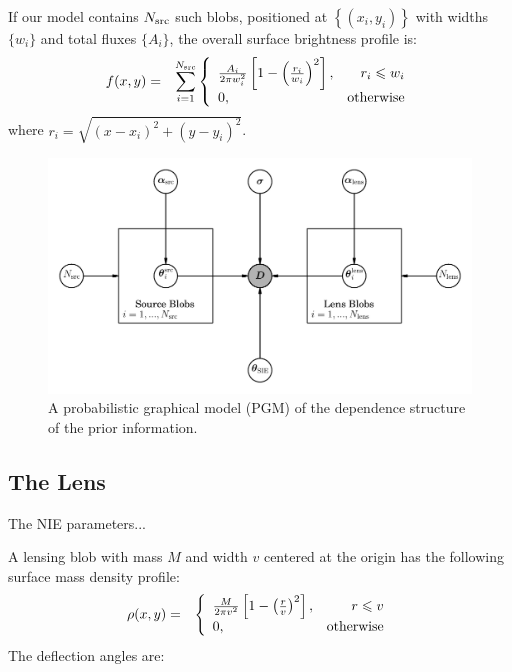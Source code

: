 \documentclass[useAMS,usenatbib]{mn2e}
\begin{document}
If our model contains $N_{\rm src}$ such blobs, positioned at
$\left\{(x_i, y_i)\right\}$ with widths $\{w_i\}$ and total fluxes
$\{A_i\}$, the overall surface brightness profile is:
\begin{eqnarray}
f(x, y) &=& \sum_{i=1}^{N_{\rm src}}\left\{
\begin{array}{lr}
\frac{A_i}{2\pi w_i^2}\left[1 - \left(\frac{r_i}{w_i}\right)^2\right], & r_i \leq w_i\\
0, & \textnormal{otherwise}
\end{array}
\right.
\end{eqnarray}
where $r_i = \sqrt{(x - x_i)^2 + (y - y_i)^2}$.


\begin{figure}
\includegraphics{pgm.pdf}
\caption{A probabilistic graphical model (PGM) of the dependence structure
of the prior information.\label{fig:pgm}}
\end{figure}


\subsection{The Lens}

The NIE parameters...

A lensing blob with mass $M$ and width $v$
centered at the origin has the following surface mass density profile:
\begin{eqnarray}
\rho(x, y) &=& \left\{
\begin{array}{lr}
\frac{M}{2\pi v^2}\left[1 - \left(\frac{r}{v}\right)^2\right], & r \leq v\\
0, & \textnormal{otherwise}
\end{array}
\right.
\end{eqnarray}
The deflection angles are:
\end{document}
